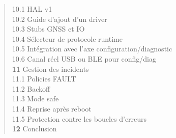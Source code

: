 \begin{quote}
\hspace{2.5em} 10.1 \hspace{0.5em} HAL v1 \dotfill \pageref{subsec:hal_v1}\\
\hspace{2.5em} 10.2 \hspace{0.5em} Guide d'ajout d'un driver \dotfill \pageref{subsec:hal_guide}\\
\hspace{2.5em} 10.3 \hspace{0.5em} Stubs GNSS et IO \dotfill \pageref{subsec:hal_stubs_impl}\\
\hspace{2.5em} 10.4 \hspace{0.5em} Sélecteur de protocole runtime \dotfill \pageref{subsec:proto_sel}\\
\hspace{2.5em} 10.5 \hspace{0.5em} Intégration avec l'axe configuration/diagnostic \dotfill \pageref{subsec:integ_cfg_diag}\\
\hspace{2.5em} 10.6 \hspace{0.5em} Canal réel USB ou BLE pour config/diag \dotfill \pageref{subsec:canal_reel}\\
\textbf{11} \hspace{0.8em} Gestion des incidents \dotfill \pageref{sec:incidents}\\
\hspace{2.5em} 11.1 \hspace{0.5em} Policies FAULT \dotfill \pageref{subsec:fault_pol}\\
\hspace{2.5em} 11.2 \hspace{0.5em} Backoff \dotfill \pageref{subsec:backoff}\\
\hspace{2.5em} 11.3 \hspace{0.5em} Mode safe \dotfill \pageref{subsec:safemode}\\
\hspace{2.5em} 11.4 \hspace{0.5em} Reprise après reboot \dotfill \pageref{subsec:reboot_resume}\\
\hspace{2.5em} 11.5 \hspace{0.5em} Protection contre les boucles d'erreurs \dotfill \pageref{subsec:antiloop}\\
\textbf{12} \hspace{0.8em} Conclusion \dotfill \pageref{sec:conclu_ch4}\\
\end{quote}

